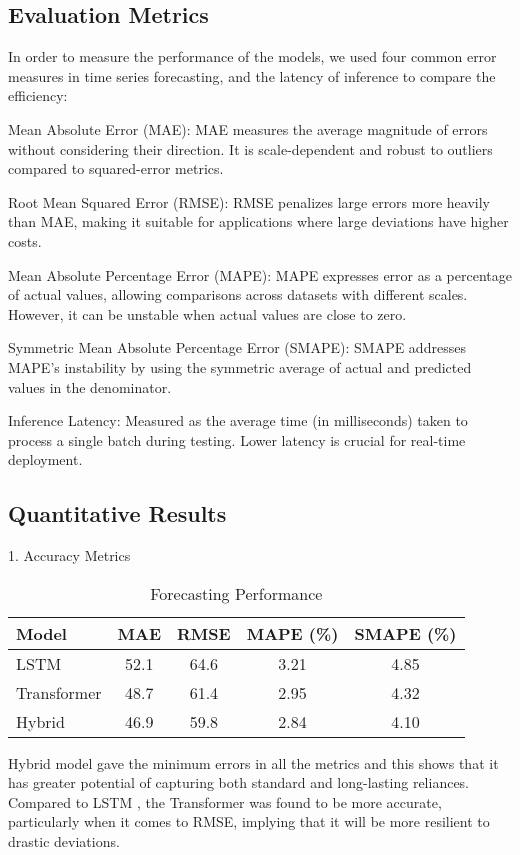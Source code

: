 \documentclass[conference]{IEEEtran}
\begin{document}
\subsection{Evaluation Metrics}
In order to measure the performance of the models, we used four common error measures in time series forecasting, and the latency of inference to compare the efficiency:

Mean Absolute Error (MAE):
MAE measures the average magnitude of errors without considering their direction. It is scale-dependent and robust to outliers compared to squared-error metrics.

Root Mean Squared Error (RMSE):
RMSE penalizes large errors more heavily than MAE, making it suitable for applications where large deviations have higher costs.

Mean Absolute Percentage Error (MAPE):
MAPE expresses error as a percentage of actual values, allowing comparisons across datasets with different scales. However, it can be unstable when actual values are close to zero.

Symmetric Mean Absolute Percentage Error (SMAPE):
SMAPE addresses MAPE’s instability by using the symmetric average of actual and predicted values in the denominator.

Inference Latency:
Measured as the average time (in milliseconds) taken to process a single batch during testing. Lower latency is crucial for real-time deployment.
\subsection{Quantitative Results}
1. Accuracy Metrics
\begin{table}[htbp]
\caption{Forecasting Performance}
\centering
\begin{tabular}{lcccc}
\toprule
\textbf{Model} & \textbf{MAE} & \textbf{RMSE} & \textbf{MAPE (\%)} & \textbf{SMAPE (\%)} \\
\midrule
LSTM \cite{hochreiter1997lstm}         & 52.1 & 64.6 & 3.21 & 4.85 \\
Transformer \cite{vaswani2017attention}  & 48.7 & 61.4 & 2.95 & 4.32 \\
Hybrid \cite{wu2020deep}       & 46.9 & 59.8 & 2.84 & 4.10 \\
\bottomrule
\end{tabular}
\end{table}

Hybrid \cite{wu2020deep} model gave the minimum errors in all the metrics and this shows that it has greater potential of capturing both standard and long-lasting reliances. Compared to LSTM \cite{hochreiter1997lstm}, the Transformer \cite{vaswani2017attention} was found to be more accurate, particularly when it comes to RMSE, implying that it will be more resilient to drastic deviations.
\end{document}
